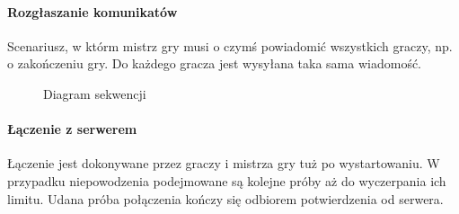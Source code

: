 \documentclass[11pt]{article}
\begin{document}
\paragraph{Rozgłaszanie komunikatów}

Scenariusz, w którm mistrz gry musi o czymś powiadomić wszystkich graczy, np. o zakończeniu gry. Do każdego gracza jest wysyłana taka sama wiadomość.

\begin{figure}[!h]
	\centering
	\caption{Diagram sekwencji}
		\hspace*{-1.3cm}
\end{figure}
\FloatBarrier

\newpage

\paragraph{Łączenie z serwerem}

Łączenie jest dokonywane przez graczy i mistrza gry tuż po wystartowaniu. W przypadku niepowodzenia podejmowane są kolejne próby aż do wyczerpania ich limitu. Udana próba połączenia kończy się odbiorem potwierdzenia od serwera.
\end{document}
